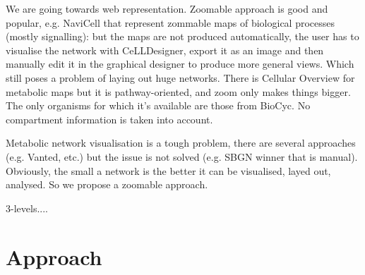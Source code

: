 \documentclass{bioinfo}
\begin{document}





We are going towards web representation. Zoomable approach is good and popular, e.g. NaviCell that represent zommable maps of biological processes (mostly signalling): but the maps are not produced automatically, the user has to visualise the network with CeLLDesigner, export it as an image and then manually edit it in the graphical designer to produce more general views. Which still poses a problem of laying out huge networks. 
There is Cellular Overview for metabolic maps but it is pathway-oriented, and zoom only makes things bigger. The only organisms for which it's available are those from BioCyc. No compartment information is taken into account.

Metabolic network visualisation is a tough problem, there are several approaches (e.g. Vanted, etc.) but the issue is not solved (e.g. SBGN winner that is manual). Obviously, the small a network is the better it can be visualised, layed out, analysed. So we propose a zoomable approach.

3-levels....


\section{Approach}
\end{document}
